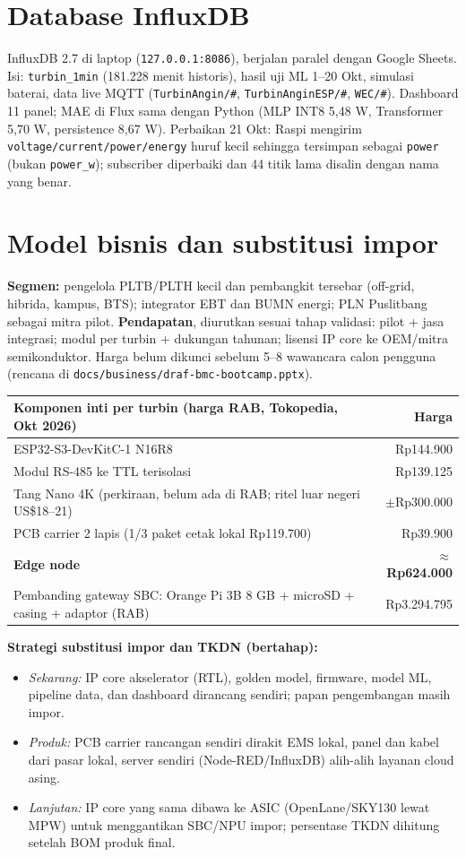 \documentclass[10.5pt,a4paper]{article}
\newcommand{\cmd}[1]{\texttt{#1}}
\begin{document}
\section{Database InfluxDB}\label{sec:influx}
InfluxDB 2.7 di laptop (\cmd{127.0.0.1:8086}), berjalan paralel dengan Google Sheets. Isi: \cmd{turbin\_1min} (181.228 menit historis), hasil uji ML 1--20 Okt,
simulasi baterai, data live MQTT (\cmd{TurbinAngin/\#}, \cmd{TurbinAnginESP/\#}, \cmd{WEC/\#}). Dashboard 11 panel; MAE di Flux sama dengan Python
(MLP INT8 5,48 W, Transformer 5,70 W, persistence 8,67 W). Perbaikan 21 Okt: Raspi mengirim \cmd{voltage/current/power/energy} huruf kecil sehingga tersimpan sebagai
\cmd{power} (bukan \cmd{power\_w}); subscriber diperbaiki dan 44 titik lama disalin dengan nama yang benar.

\section{Model bisnis dan substitusi impor}\label{sec:bisnis}
\textbf{Segmen:} pengelola PLTB/PLTH kecil dan pembangkit tersebar (off-grid, hibrida, kampus, BTS); integrator EBT dan BUMN energi; PLN Puslitbang sebagai mitra pilot.
\textbf{Pendapatan}, diurutkan sesuai tahap validasi: pilot + jasa integrasi; modul per turbin + dukungan tahunan; lisensi IP core ke OEM/mitra semikonduktor.
Harga belum dikunci sebelum 5--8 wawancara calon pengguna (rencana di \cmd{docs/business/draf-bmc-bootcamp.pptx}).
\begin{center}
\small
\begin{tabularx}{0.85\linewidth}{@{}X r@{}}
\toprule
Komponen inti per turbin (harga RAB, Tokopedia, Okt 2026) & Harga \\
\midrule
ESP32-S3-DevKitC-1 N16R8 & Rp144.900 \\
Modul RS-485 ke TTL terisolasi & Rp139.125 \\
Tang Nano 4K (perkiraan, belum ada di RAB; ritel luar negeri US\$18--21) & $\pm$Rp300.000 \\
PCB carrier 2 lapis (1/3 paket cetak lokal Rp119.700) & Rp39.900 \\
\midrule
\textbf{Edge node} & \textbf{$\approx$Rp624.000} \\
Pembanding gateway SBC: Orange Pi 3B 8 GB + microSD + casing + adaptor (RAB) & Rp3.294.795 \\
\bottomrule
\end{tabularx}
\end{center}
\textbf{Strategi substitusi impor dan TKDN (bertahap):}
\begin{itemize}
  \item \emph{Sekarang:} IP core akselerator (RTL), golden model, firmware, model ML, pipeline data, dan dashboard dirancang sendiri; papan pengembangan masih impor.
  \item \emph{Produk:} PCB carrier rancangan sendiri dirakit EMS lokal, panel dan kabel dari pasar lokal, server sendiri (Node-RED/InfluxDB) alih-alih layanan cloud asing.
  \item \emph{Lanjutan:} IP core yang sama dibawa ke ASIC (OpenLane/SKY130 lewat MPW) untuk menggantikan SBC/NPU impor; persentase TKDN dihitung setelah BOM produk final.
\end{itemize}
\end{document}
